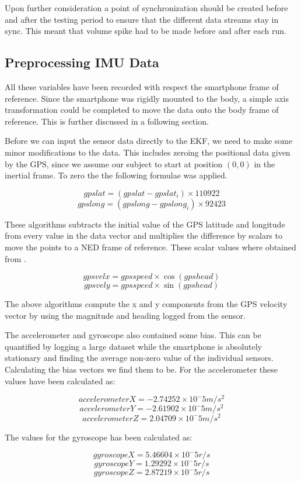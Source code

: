 Upon further consideration a point of synchronization should be created before and after the testing period to ensure that the different data streams stay in sync. This meant that volume spike had to be made before and after each run. 

\subsection{Preprocessing IMU Data}
All these variables have been recorded with respect the smartphone frame of reference. Since the smartphone was rigidly mounted to the body, a simple axis transformation could be completed to move the data onto the body frame of reference. This is further discussed in a following section.

Before we can input the sensor data directly to the EKF, we need to make some minor modifications to the data. This includes zeroing the positional data given by the GPS, since we assume our subject to start at position $ (0,0) $ in the inertial frame. To zero the the following formulae was applied.

$$  gps lat = ( gps lat -  gps lat_i)\times 110922 $$
$$  gps long = ( gps long -  gps long_i)\times 92423 $$

These algorithms subtracts the initial value of the GPS latitude and longitude from every value in the data vector and multiplies the difference by scalars to move the points to a NED frame of reference. These scalar values where obtained from \cite{gps}.
  
$$  gps vel x =  gps speed \times \cos( gps head) $$
$$  gps vel y =  gps speed \times \sin( gps head) $$

The above algorithms compute the x and y components from the GPS velocity vector by using the magnitude and heading logged from the sensor.

The accelerometer and gyroscope also contained some bias. This can be quantified by logging a large dataset while the smartphone is absolutely stationary and finding the average non-zero value of the individual sensors. Calculating the bias vectors we find them to be. For the accelerometer these values have been calculated as:

$$accelerometer X = -2.74252 \times 10^-5	m/s^2 $$
$$accelerometer Y = -2.61902 \times 10^-5	m/s^2 $$
$$accelerometer Z = 2.04709  \times 10^-5	m/s^2 $$

The values for the gyroscope has been calculated as:

$$gyroscope X = 5.46604 \times 10^-5	r/s $$	
$$gyroscope Y = 1.29292 \times 10^-5	r/s $$		
$$gyroscope Z = 2.87219 \times 10^-5	r/s $$ 

